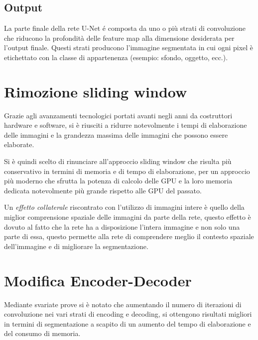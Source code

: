 
\subsection{Output} %
\label{sec:Output}
La parte finale della rete U-Net \'e composta da uno o più strati di convoluzione che riducono la profondità delle feature map alla dimensione desiderata per l'output finale. Questi strati producono l'immagine segmentata in cui ogni pixel è etichettato con la classe di appartenenza (esempio: sfondo, oggetto, ecc.).


\section{Rimozione sliding window} %
\label{sub:Rimozione sliding window}
Grazie agli avanzamenti tecnologici portati avanti negli anni da costruttori hardware e software, si è riusciti a ridurre notevolmente i tempi di elaborazione delle immagini e la grandezza massima delle immagini che possono essere elaborate.

Si è quindi scelto di rinunciare all'approccio sliding window che risulta più conservativo in termini di memoria e di tempo di elaborazione, per un approccio più moderno che sfrutta la potenza di calcolo delle GPU e la loro memoria dedicata notevolmente più grande rispetto alle GPU del passato.

Un \textit{effetto collaterale} riscontrato con l'utilizzo di immagini intere è quello della miglior comprensione spaziale delle immagini da parte della rete, questo effetto è dovuto al fatto che la rete ha a disposizione l'intera immagine e non solo una parte di essa, questo permette alla rete di comprendere meglio il contesto spaziale dell'immagine e di migliorare la segmentazione.




\section{Modifica Encoder-Decoder}

Mediante svariate prove si è notato che aumentando il numero di iterazioni di convoluzione nei vari strati di encoding e decoding, si ottengono risultati migliori in termini di segmentazione a scapito di un aumento del tempo di elaborazione e del consumo di memoria.

